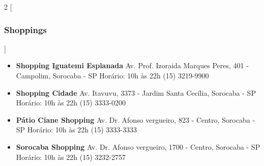 \begin{multicols}{2}
  [
  \subsubsection{Shoppings}
  ]
  \begin{itemize}
    \item \textbf{Shopping Iguatemi Esplanada}
      \newline Av. Prof. Izoraida Marques Peres, 401 - Campolim, Sorocaba - SP
      \newline Horário: 10h às 22h
      \newline (15) 3219-9900
  \end{itemize}
  \begin{itemize}
    \item \textbf{Shopping Cidade}
      \newline Av. Itavuvu, 3373 - Jardim Santa Cecília, Sorocaba - SP
      \newline Horário: 10h às 22h
      \newline (15) 3333-0200
  \end{itemize}
  \begin{itemize}
    \item \textbf{Pátio Ciane Shopping}
      \newline Av. Dr. Afonso vergueiro, 823 - Centro, Sorocaba - SP
      \newline Horário: 10h às 22h
      \newline (15) 3333-3333
  \end{itemize}
  \begin{itemize}
    \item \textbf{Sorocaba Shopping}
      \newline Av. Dr. Afonso vergueiro, 1700 - Centro, Sorocaba - SP
      \newline Horário: 10h às 22h
      \newline (15) 3232-2757
  \end{itemize}
\end{multicols}

